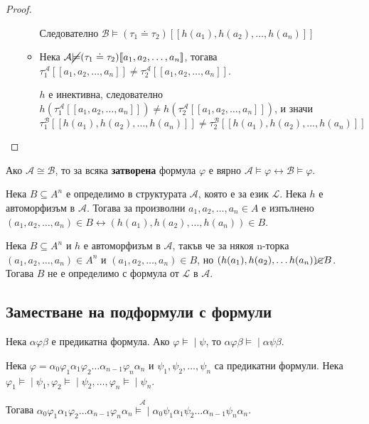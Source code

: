\documentclass{article}
\newcommand{\mymod}{\models\!\mid}
\begin{document}
\begin{thm}
\begin{proof}
\begin{itemize}
\begin{itemize}
Следователно $\mathcal{B} \models (\tau_1 \doteq \tau_2)[\![h(a_1), h(a_2), \ldots, h(a_n)]\!]$

\item Нека $\mathcal{A} \cancel{\models} (\tau_1 \doteq \tau_2)[\![a_1, a_2, \ldots, a_n]\!]$, тогава $\tau_1^\mathcal{A}[\![a_1, a_2, \ldots, a_n]\!] \neq \tau_2^\mathcal{A}[\![a_1, a_2, \ldots, a_n]\!]$.

$h$ е инективна, следователно $h(\tau_1^\mathcal{A}[\![a_1, a_2, \ldots, a_n]\!]) \neq h(\tau_2^\mathcal{A}[\![a_1, a_2, \ldots, a_n]\!])$, и значи $\tau_1^\mathcal{B}[\![h(a_1), h(a_2), \ldots, h(a_n)]\!] \neq \tau_2^\mathcal{B}[\![h(a_1), h(a_2), \ldots, h(a_n)]\!]$
\end{itemize}
\end{itemize}
\end{proof}
\fi

\setcounter{conseq}{0}

\begin{conseq}
Ако $\mathcal{A} \cong \mathcal{B}$, то за всяка \textbf{затворена} формула $\varphi$ е вярно $\mathcal{A} \models \varphi \longleftrightarrow \mathcal{B} \models \varphi$.
\end{conseq}

\begin{conseq}
Нека $B \subseteq A^n$ е определимо в структурата $\mathcal{A}$, която е за език $\mathcal{L}$. Нека $h$ е автоморфизъм в $\mathcal{A}$. Тогава за произволни $a_1, a_2, \ldots, a_n \in A$ е изпълнено $(a_1, a_2, \ldots, a_n) \in B \longleftrightarrow (h(a_1), h(a_2), \ldots, h(a_n)) \in B$.
\end{conseq}

\begin{conseq}
Нека $B \subseteq A^n$ и $h$ е автоморфизъм в $\mathcal{A}$, такъв че за някоя n-торка $(a_1, a_2, \ldots, a_n) \in A^n$ и $(a_1, a_2, \ldots, a_n) \in B$, но $(h(a_1), h(a_2), \ldots h(a_n)) \cancel{\in} B$. Тогава $B$ не е определимо с формула от $\mathcal{L}$ в $\mathcal{A}$.
\end{conseq}

\end{thm}


\subsection*{Заместване на подформули с формули}

\begin{thm}
Нека $\alpha\varphi\beta$ е предикатна формула. Ако $\varphi \mymod \psi$, то $\alpha\varphi\beta \mymod \alpha\psi\beta$.

Нека $\varphi = \alpha_0\varphi_1\alpha_1\varphi_2\ldots\alpha_{n-1}\varphi_n\alpha_n$ и $\psi_1, \psi_2, \ldots, \psi_n$ са предикатни формули. Нека $\varphi_1 \mymod \psi_1, \varphi_2 \mymod \psi_2, \ldots, \varphi_n \mymod \psi_n$.

Тогава $\alpha_0\varphi_1\alpha_1\varphi_2\ldots\alpha_{n-1}\varphi_n\alpha_n \overset{\mathcal{A}}{\mymod} \alpha_0\psi_1\alpha_1\psi_2\ldots\alpha_{n-1}\psi_n\alpha_n$.
\end{thm}
\end{document}
